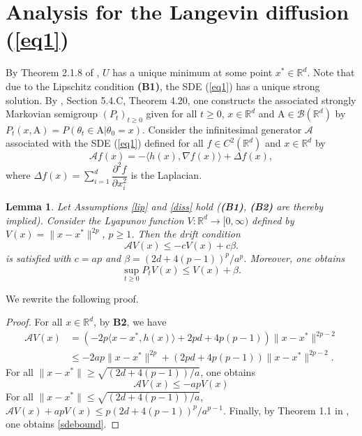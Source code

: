 \documentclass[a4paper]{article}
\newtheorem{lemma}[theorem]{Lemma}
\def\Rd{\mathbb{R}^{d}}
\begin{document}
\section{Analysis for the Langevin diffusion (\ref{eq1})}\label{sec_langevin}

By Theorem 2.1.8 of \cite{nesterov}, $U$ has a unique minimum at
some point $x^*\in\mathbb{R}^{d}$.
Note that due to the Lipschitz condition {\bf (B1)}, the SDE (\ref{eq1}) has a unique strong solution. By \cite{kar1991}, Section 5.4.C, Theorem 4.20, one constructs the associated strongly Markovian semigroup $(P_t)_{t\geq0}$ given for all $t\geq 0$, $x \in \mathbb{R}^{d}$ and $\mathrm{A}\in \mathcal{B}(\mathbb{R}^{d})$ by $P_t(x,\mathrm{A})=P(\theta_t \in\mathrm{A}|\theta_0=x)$. Consider the infinitesimal generator $\mathcal{A}$ associated with the SDE (\ref{eq1}) defined for all $f \in C^2(\mathbb{R}^{d})$ and $x\in \mathbb{R}^{d}$ by
\[
\mathcal{A}f(x)=-\langle h(x),\nabla f(x) \rangle +\Delta f(x),
\]
where $\Delta f(x)=\sum\limits_{i=1}^d \dfrac{\partial^2 f}{\partial x_i^2}$ is the Laplacian.




\begin{lemma}\label{prop1}
Let Assumptions \ref{lip} and \ref{diss} hold ({\bf (B1)}, {\bf (B2)} are
thereby implied). Consider the Lyapunov function $V: \Rd \rightarrow [0,
\infty)$ defined by \color{red}$V(x) = \|x-x^*\|^{2p}$\color{black}, $p \geq 1$. Then the drift
condition
\begin{equation}\label{Lyapeq}
\mathcal{A} V(x) \leq -cV(x) + c\beta.
\end{equation} 
is satisfied with $c=ap$ and $\beta=(2d+4(p-1))^p/a^p$.
Moreover, one obtains
\begin{equation}\label{sdebound}
\sup_{t \geq 0} P_t V(x) \leq V(x) +\beta.
\end{equation}
\end{lemma}
\color{red} We rewrite the following proof. \color{black}
\begin{proof}
For all $x \in \mathbb{R}^d$, by {\bf{B2}}, we have
\begin{align*}
\mathcal{A}V(x) &= \left(-2p \langle x-x^*,h(x) \rangle
+2pd+4p(p-1)\right)\|x-x^*\|^{2p-2}\\
& \leq -2ap\|x-x^*\|^{2p}
+(2pd+4p(p-1))\|x-x^*\|^{2p-2}.
\end{align*}
For all $\|x-x^*\| \geq \sqrt{(2d+4(p-1))/a}$, one obtains
\[
\mathcal{A}V(x) \leq -apV(x)
\]
For all $\|x-x^*\| \leq \sqrt{(2d+4(p-1))/a}$, $\mathcal{A}V(x) +apV(x)\leq
p(2d+4(p-1))^p/a^{p-1}$. Finally, by Theorem 1.1 in \cite{Mey1993}, one
obtains \eqref{sdebound}.
\end{proof}
\end{document}
